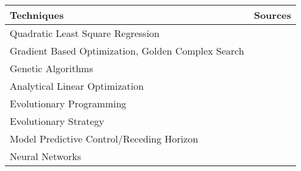 \begin{table}[ht]
\begin{tabular}{p{10cm} p{5cm}}
\toprule
Techniques 			&       Sources	 	\\
\midrule \midrule
Quadratic Least Square Regression	&  \cite{Ahn2001}  \\

Gradient Based Optimization, Golden Complex Search  & \cite{Huh2008}\cite{Atthajariyakul2004} \\





Genetic Algorithms 	& \cite{LuLu2004}\cite{LuLu2005Part2}\cite{LuLu2005HVACSystemOptimization}\cite{Nassif2005}\cite{Wang2000Model-basedAlgorithm}\cite{XuXinhua2009} \cite{Mossolly-Ghali-Ghaddar_2009_Energy}\cite{Congradac2009HVACAlgorithms}\cite{Jin2005Prediction-basedSystems}\cite{WeiXiupeng2014ModelingAndOptimizationOfAChillerPlant}	\\


Analytical Linear Optimization 	& 	\cite{Cui2004} \\

Evolutionary Programming    & 	\cite{Fong2006HVACProgramming}\cite{Kusiak2011MultiObjective}	 \\

Evolutionary Strategy       &  \cite{Kusiak2010}  \\

Model Predictive Control/Receding Horizon    &  \cite{Henze2005}\cite{Gruber2014AlternativeBuildings}\cite{Freire2008PredictiveSavings}\cite{Kusiak2010ReheatBox}\cite{XuMin2005}\cite{Yuan2006Multiple-zoneStrategy} \\

Neural Networks     &  \cite{Ning2010Neuro-optimalSystem}\cite{Kusiak2010}\cite{Guo2007}\cite{Kusiak2012ModelingAndOptimizationOfHVAC}\cite{Kusiak2011OptimizationOfAnHVACSystemWithAStrength}\cite{Kusiak2014MinimizationOfEnergyConsumptionInHVAC}	 \\


\end{tabular}
\end{table}
